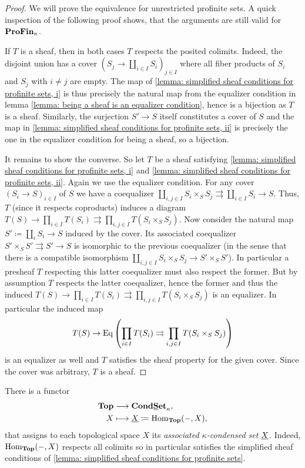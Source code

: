 \begin{proof}
	We will prove the equivalence for unrestricted profinite sets. A quick inspection of the following proof shows, that the arguments are still valid for ${\mathbf{ProFin}}_{\kappa}$.
	
	If $T$ is a sheaf, then in both cases $T$ respects the posited colimits. Indeed, the disjoint union has a cover $(S_j\to \coprod_{i\in I} S_i)_{j\in I}$ where all fiber products of $S_i$ and $S_j$ with $i\ne j$ are empty. The map of \ref{lemma: simplified sheaf conditions for profinite sets, i} is thus precisely the natural map from the equalizer condition in lemma \ref{lemma: being a sheaf is an equalizer condition}, hence is a bijection as $T$ is a sheaf. Similarly, the surjection $S'\to S$ itself constitutes a cover of $S$ and the map in \ref{lemma: simplified sheaf conditions for profinite sets, ii} is precisely the one in the equalizer condition for being a sheaf, so a bijection.
		
	It remains to show the converse. So let $T$ be a sheaf satisfying \ref{lemma: simplified sheaf conditions for profinite sets, i} and \ref{lemma: simplified sheaf conditions for profinite sets, ii}. Again we use the equalizer condition. For any cover $(S_i \to S)_{i\in I}$ of $S$ we have a coequalizer $\coprod_{i,j\in I}S_i\times_S S_j \rightrightarrows \coprod_{i\in I} S_i \to S$. Thus, $T$ (since it respects coproducts) induces a diagram $T(S)\to \prod_{i\in I}T(S_i)\rightrightarrows\prod_{i, j \in I} T(S_i\times_S S_j)$. Now consider the natural map $S'\coloneqq \coprod_i S_i \to S$ induced by the cover. Its associated coequalizer $S'\times_S S'\rightrightarrows S'\to S$ is isomorphic to the previous coequalizer (in the sense that there is a compatible isomorphism $\coprod_{i,j\in I} S_i\times_S S_j\to S'\times_S S'$). In particular a presheaf $T$ respecting this latter coequalizer must also respect the former. But by assumption $T$ respects the latter coequalizer, hence the former and thus the induced $T(S)\to \prod_{i\in I}T(S_i)\rightrightarrows\prod_{i, j \in I} T(S_i\times_S S_j)$	is an equalizer. In particular the induced map
		$$T(S)\to \operatorname{Eq}\left(\prod_{i\in I}T(S_i)\rightrightarrows\prod_{i, j \in I} T(S_i\times_S S_j)\right)$$
	is an equalizer as well and $T$ satisfies the sheaf property for the given cover. Since the cover was arbitrary, $T$ is a sheaf.
\end{proof}

\begin{definition}
	\label{definition: associated kappa-condensed sets}
	
	There is a functor
	\begin{align*}
		{{\mathbf{Top}}} &\longrightarrow {{{\mathbf{Cond}}}{{\mathbf{\underline{S}et}}}_{\kappa}},\\
		X&\longmapsto \underline{X}\coloneqq {\operatorname{Hom}}_{{\mathbf{Top}}}(-, X),
	\end{align*}
	that assigns to each topological space $X$ its \emph{associated $\kappa$-condensed set} $\underline{X}$. Indeed, ${\operatorname{Hom}}_{{\mathbf{Top}}}(-, X)$ respects all colimits so in particular satisfies the simplified sheaf conditions of \ref{lemma: simplified sheaf conditions for profinite sets}.
\end{definition}

